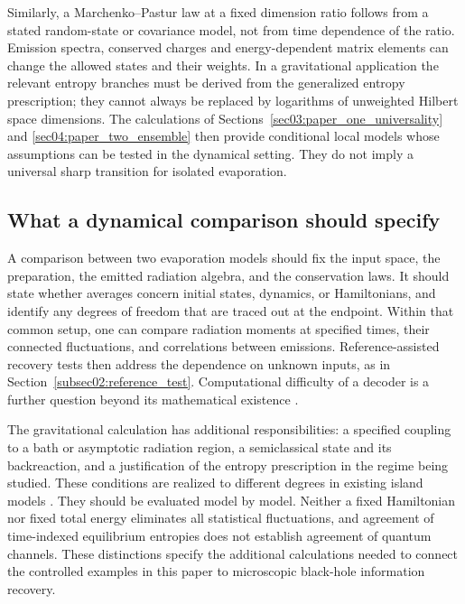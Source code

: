 \documentclass[11pt,letterpaper]{article}
\theoremstyle{plain}
\theoremstyle{definition}
\theoremstyle{remark}
\begin{document}
Similarly, a Marchenko--Pastur law at a fixed dimension ratio follows
from a stated random-state or covariance model, not from time
dependence of the ratio. Emission spectra, conserved charges and
energy-dependent matrix elements can change the allowed states and
their weights. In a gravitational application the relevant entropy
branches must be derived from the generalized entropy prescription;
they cannot always be replaced by logarithms of unweighted Hilbert
space dimensions. The calculations of
Sections~\ref{sec03:paper_one_universality} and
\ref{sec04:paper_two_ensemble} then provide conditional local models
whose assumptions can be tested in the dynamical setting. They do
not imply a universal sharp transition for isolated evaporation.

\subsection{What a dynamical comparison should specify}
\label{subsec08:dynamical_target}

A comparison between two evaporation models should fix the input
space, the preparation, the emitted radiation algebra, and the
conservation laws. It should state whether averages concern initial
states, dynamics, or Hamiltonians, and identify any degrees of freedom
that are traced out at the endpoint. Within that common setup, one
can compare radiation moments at specified times, their connected
fluctuations, and correlations between emissions. Reference-assisted
recovery tests then address the dependence on unknown inputs, as in
Section~\ref{subsec02:reference_test}. Computational difficulty of a
decoder is a further question beyond its mathematical existence
\citep{haydenpreskill2007}.

The gravitational calculation has additional responsibilities: a
specified coupling to a bath or asymptotic radiation region, a
semiclassical state and its backreaction, and a justification of the
entropy prescription in the regime being studied. These conditions
are realized to different degrees in existing island models
\citep{almheirietal2019,almheirietal2020page,almheirietal2020review}.
They should be evaluated model by model. Neither a fixed Hamiltonian
nor fixed total energy eliminates all statistical fluctuations, and
agreement of time-indexed equilibrium entropies does not establish
agreement of quantum channels. These distinctions specify the
additional calculations needed to connect the controlled examples in
this paper to microscopic black-hole information recovery.
\end{document}
